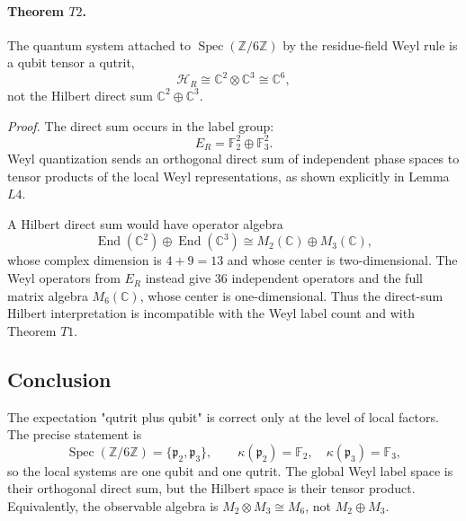 \paragraph{Theorem \(T2\).}
The quantum system attached to \(\operatorname{Spec}(\mathbb Z/6\mathbb Z)\)
by the residue-field Weyl rule is a qubit tensor a qutrit,
\[
  \mathcal H_R\cong\mathbb C^2\otimes\mathbb C^3\cong\mathbb C^6,
\]
not the Hilbert direct sum \(\mathbb C^2\oplus\mathbb C^3\).

\emph{Proof.}
The direct sum occurs in the label group:
\[
  E_R=\mathbb F_2^2\oplus\mathbb F_3^2.
\]
Weyl quantization sends an orthogonal direct sum of independent phase spaces
to tensor products of the local Weyl representations, as shown explicitly in
Lemma \(L4\).

A Hilbert direct sum would have operator algebra
\[
  \operatorname{End}(\mathbb C^2)\oplus\operatorname{End}(\mathbb C^3)
  \cong M_2(\mathbb C)\oplus M_3(\mathbb C),
\]
whose complex dimension is \(4+9=13\) and whose center is two-dimensional.
The Weyl operators from \(E_R\) instead give \(36\) independent operators and
the full matrix algebra \(M_6(\mathbb C)\), whose center is one-dimensional.
Thus the direct-sum Hilbert interpretation is incompatible with the Weyl label
count and with Theorem \(T1\).

\subsection{Conclusion}

The expectation "qutrit plus qubit" is correct only at the level of local
factors.  The precise statement is
\[
  \operatorname{Spec}(\mathbb Z/6\mathbb Z)
  =
  \{\mathfrak p_2,\mathfrak p_3\},
  \qquad
  \kappa(\mathfrak p_2)=\mathbb F_2,\quad
  \kappa(\mathfrak p_3)=\mathbb F_3,
\]
so the local systems are one qubit and one qutrit.  The global Weyl label
space is their orthogonal direct sum, but the Hilbert space is their tensor
product.  Equivalently, the observable algebra is \(M_2\otimes M_3\cong M_6\),
not \(M_2\oplus M_3\).
